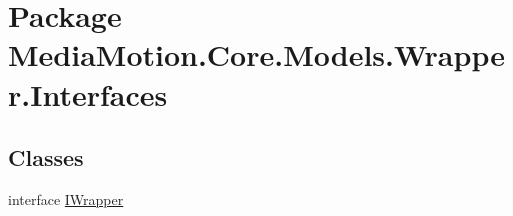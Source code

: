 \hypertarget{namespace_media_motion_1_1_core_1_1_models_1_1_wrapper_1_1_interfaces}{\section{Package Media\+Motion.\+Core.\+Models.\+Wrapper.\+Interfaces}
\label{namespace_media_motion_1_1_core_1_1_models_1_1_wrapper_1_1_interfaces}
}
\subsection*{Classes}
\begin{DoxyCompactItemize}
\item 
interface \hyperlink{interface_media_motion_1_1_core_1_1_models_1_1_wrapper_1_1_interfaces_1_1_i_wrapper}{I\+Wrapper}
\end{DoxyCompactItemize}
